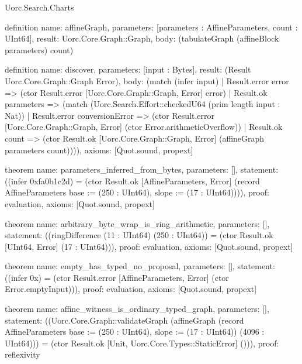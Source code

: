 \begin{lexlean}{Uorc.Search.Charts}
\begin{semanticmodule}
definition{
  name: affineGraph,
  parameters: [parameters : AffineParameters, count : UInt64],
  result: Uorc.Core.Graph::Graph,
  body: (tabulateGraph (affineBlock parameters) count)
}

definition{
  name: discover,
  parameters: [input : Bytes],
  result: (Result Uorc.Core.Graph::Graph Error),
  body: (match (infer input)
    | Result.error error => (ctor Result.error [Uorc.Core.Graph::Graph, Error] error)
    | Result.ok parameters => (match (Uorc.Search.Effort::checkedU64 (prim length input : Nat))
      | Result.error conversionError => (ctor Result.error [Uorc.Core.Graph::Graph, Error] (ctor Error.arithmeticOverflow))
      | Result.ok count => (ctor Result.ok [Uorc.Core.Graph::Graph, Error] (affineGraph parameters count)))),
  axioms: [Quot.sound, propext]
}

theorem{
  name: parameters_inferred_from_bytes,
  parameters: [],
  statement: ((infer 0xfa0b1c2d) = (ctor Result.ok [AffineParameters, Error] (record AffineParameters {base := (250 : UInt64), slope := (17 : UInt64)}))),
  proof: evaluation{},
  axioms: [Quot.sound, propext]
}

theorem{
  name: arbitrary_byte_wrap_is_ring_arithmetic,
  parameters: [],
  statement: ((ringDifference (11 : UInt64) (250 : UInt64)) = (ctor Result.ok [UInt64, Error] (17 : UInt64))),
  proof: evaluation{},
  axioms: [Quot.sound, propext]
}

theorem{
  name: empty_has_typed_no_proposal,
  parameters: [],
  statement: ((infer 0x) = (ctor Result.error [AffineParameters, Error] (ctor Error.emptyInput))),
  proof: evaluation{},
  axioms: [Quot.sound, propext]
}

theorem{
  name: affine_witness_is_ordinary_typed_graph,
  parameters: [],
  statement: ((Uorc.Core.Graph::validateGraph (affineGraph (record AffineParameters {base := (250 : UInt64), slope := (17 : UInt64)}) (4096 : UInt64))) = (ctor Result.ok [Unit, Uorc.Core.Types::StaticError] ())),
  proof: reflexivity{}
}
\end{semanticmodule}
\end{lexlean}
